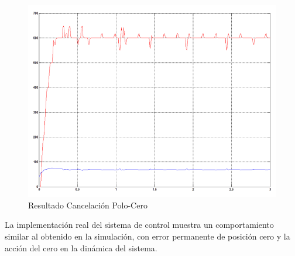 \documentclass[twocolumn]{IEEEtran}
\begin{document}
\begin{figure}[H]
	\centering
		\includegraphics[scale=0.3]{practica3.png}
	\caption{Resultado Cancelación Polo-Cero}
	\label{fig6}
\end{figure}
\noindent
La implementación real del sistema de control muestra un comportamiento similar al obtenido en la simulación, con error permanente de posición cero y la acción del cero en la dinámica del sistema.
\end{document}

